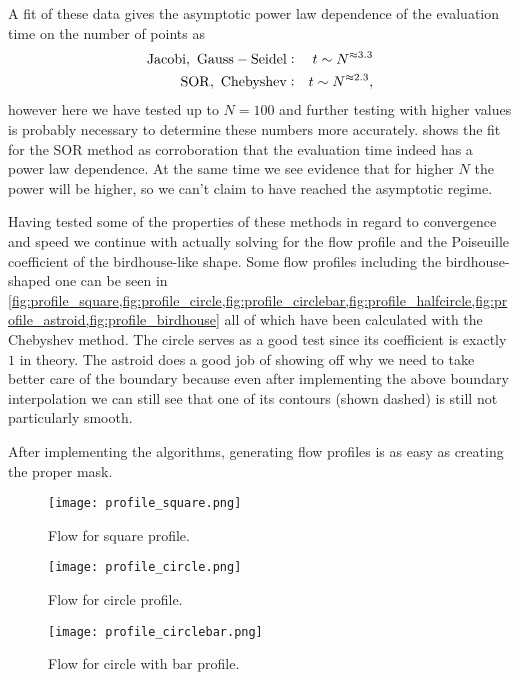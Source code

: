 \documentclass[10pt,a4paper,twocolumn]{article}
\begin{document}
A fit of these data gives the asymptotic power law dependence of the evaluation time on the number of points as
%
\begin{align}
    \mathrm{Jacobi,\ Gauss-Seidel:}& &t \sim N^{\approx 3.3}\notag\\
    \mathrm{SOR,\ Chebyshev:}& &t \sim N^{\approx 2.3},
\end{align}
%
however here we have tested up to $N=100$ and further testing with higher values is probably necessary to determine these numbers more accurately.  shows the fit for the SOR method as corroboration that the evaluation time indeed has a power law dependence. At the same time we see evidence that for higher $N$ the power will be higher, so we can't claim to have reached the asymptotic regime.

Having tested some of the properties of these methods in regard to convergence and speed we continue with actually solving for the flow profile and the Poiseuille coefficient of the birdhouse-like shape.
Some flow profiles including the birdhouse-shaped one can be seen in \cref{fig:profile_square,fig:profile_circle,fig:profile_circlebar,fig:profile_halfcircle,fig:profile_astroid,fig:profile_birdhouse} all of which have been calculated with the Chebyshev method. The circle serves as a good test since its coefficient is exactly $1$ in theory. The astroid does a good job of showing off why we need to take better care of the boundary because even after implementing the above boundary interpolation we can still see that one of its contours (shown dashed) is still not particularly smooth.

After implementing the algorithms, generating flow profiles is as easy as creating the proper mask.

\newpage
\begin{figure}[!ht]
    \centering
    \texttt{[image: profile\_square.png]}
    \caption{Flow for square profile.}
    \label{fig:profile_square}
\end{figure}

\begin{figure}[!h]
    \centering
    \texttt{[image: profile\_circle.png]}
    \caption{Flow for circle profile.}
    \label{fig:profile_circle}
\end{figure}

\begin{figure}[!hb]
    \centering
    \texttt{[image: profile\_circlebar.png]}
    \caption{Flow for circle with bar profile.}
    \label{fig:profile_circlebar}
\end{figure}
\end{document}
